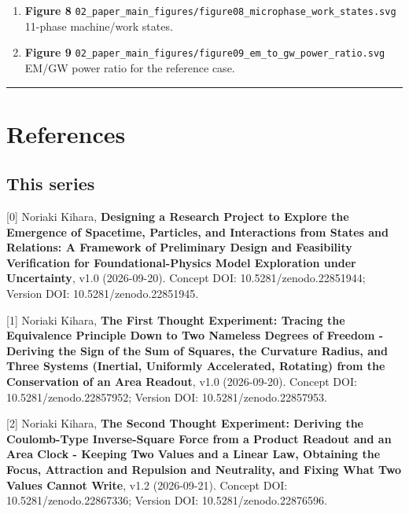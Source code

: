 \documentclass[
  a4paper,
]{article}
\begin{document}
\begin{enumerate}
  \textbf{Figure 7}
  \texttt{02\_\allowbreak{}paper\_\allowbreak{}main\_\allowbreak{}figures/\allowbreak{}figure07\_\allowbreak{}identity\_\allowbreak{}states\_\allowbreak{}NCD.svg}\\
  Identity holding of \(N,C,D\).
\item
  \textbf{Figure 8}
  \texttt{02\_\allowbreak{}paper\_\allowbreak{}main\_\allowbreak{}figures/\allowbreak{}figure08\_\allowbreak{}microphase\_\allowbreak{}work\_\allowbreak{}states.svg}\\
  11-phase machine/work states.
\item
  \textbf{Figure 9}
  \texttt{02\_\allowbreak{}paper\_\allowbreak{}main\_\allowbreak{}figures/\allowbreak{}figure09\_\allowbreak{}em\_\allowbreak{}to\_\allowbreak{}gw\_\allowbreak{}power\_\allowbreak{}ratio.svg}\\
  EM/GW power ratio for the reference case.
\end{enumerate}

\begin{center}\rule{0.5\linewidth}{0.5pt}\end{center}

\section{References}\label{references}

\subsection{This series}\label{this-series}

{[}0{]} Noriaki Kihara, \textbf{Designing a Research Project to Explore
the Emergence of Spacetime, Particles, and Interactions from States and
Relations: A Framework of Preliminary Design and Feasibility
Verification for Foundational-Physics Model Exploration under
Uncertainty}, v1.0 (2026-09-20). Concept DOI: 10.5281/zenodo.22851944;
Version DOI: 10.5281/zenodo.22851945.

{[}1{]} Noriaki Kihara, \textbf{The First Thought Experiment: Tracing
the Equivalence Principle Down to Two Nameless Degrees of Freedom -
Deriving the Sign of the Sum of Squares, the Curvature Radius, and Three
Systems (Inertial, Uniformly Accelerated, Rotating) from the
Conservation of an Area Readout}, v1.0 (2026-09-20). Concept DOI:
10.5281/zenodo.22857952; Version DOI: 10.5281/zenodo.22857953.

{[}2{]} Noriaki Kihara, \textbf{The Second Thought Experiment: Deriving
the Coulomb-Type Inverse-Square Force from a Product Readout and an Area
Clock - Keeping Two Values and a Linear Law, Obtaining the Focus,
Attraction and Repulsion and Neutrality, and Fixing What Two Values
Cannot Write}, v1.2 (2026-09-21). Concept DOI: 10.5281/zenodo.22867336;
Version DOI: 10.5281/zenodo.22876596.
\end{document}
